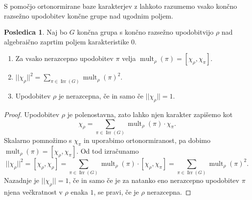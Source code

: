 \documentclass[11pt]{book}
\DeclareMathOperator\mult{mult}
\DeclareMathOperator\Irr{Irr}
\theoremstyle{definition}
\theoremstyle{zgled}
\theoremstyle{zgledbrezstevilke}
\theoremstyle{odprtproblem}
\theoremstyle{domacanaloga}
\newenvironment{dokaz}
    {\color{siva}\begin{proof}}
    {\end{proof}}
\theoremstyle{izrek}
\newtheorem{posledica}[theorem]{Posledica}
\begin{document}
S pomočjo ortonormirane baze karakterjev z lahkoto razumemo vsako končno razsežno upodobitev končne grupe nad ugodnim poljem.

\begin{posledica}
Naj bo $G$ končna grupa s končno razsežno upodobitvijo $\rho$ nad algebraično zaprtim poljem karakteristike $0$. 
\begin{enumerate}
    \item Za vsako nerazcepno upodobitev $\pi$ velja $\mult_{\rho}(\pi) = [ \chi_{\rho}, \chi_{\pi} ]$.
    \item $|| \chi_{\rho} ||^2 = \sum_{\pi \in \Irr(G)} \mult_{\rho}(\pi)^2$.
    \item Upodobitev $\rho$ je nerazcepna, če in samo če $|| \chi_{\rho} || = 1$.
\end{enumerate}
\end{posledica}
\begin{dokaz}
Upodobitev $\rho$ je polenostavna, zato lahko njen karakter zapišemo kot
\[
    \chi_{\rho} = \sum_{\pi \in \Irr(G)} \mult_{\rho}(\pi) \cdot \chi_{\pi}.
\]
Skalarno pomnožimo s $\chi_{\pi}$ in uporabimo ortonormiranost, pa dobimo $\mult_{\rho}(\pi) = [ \chi_{\rho}, \chi_{\pi} ]$. Od tod izračunamo
\[
    ||\chi_{\rho}||^2 = [ \chi_{\rho}, \chi_{\rho} ] 
    = \sum_{\pi \in \Irr(G)} \mult_{\rho}(\pi) \cdot [ \chi_{\rho}, \chi_{\pi} ] 
    = \sum_{\pi \in \Irr(G)} \mult_{\rho}(\pi)^2.
\]
Nazadnje je $||\chi_{\rho}|| = 1$, če in samo če je za natanko eno nerazcepno upodobitev $\pi$ njena večkratnost v $\rho$ enaka $1$, se pravi, če je $\rho$ nerazcepna.
\end{dokaz}
\end{document}
